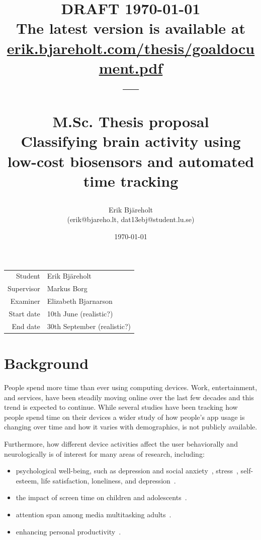 \documentclass{IEEEtran}
\title{%
    \small DRAFT \today \\
    \small The latest version is available at \href{https://erik.bjareholt.com/thesis/goaldocument.pdf}{erik.bjareholt.com/thesis/goaldocument.pdf}\\
    \large --- \\
    \large \par M.Sc. Thesis proposal\\
    \huge Classifying brain activity using low-cost biosensors and automated time tracking \\
}
\author{Erik Bjäreholt \\(erik@bjareho.lt, dat13ebj@student.lu.se)}
\date{\today}
\begin{document}
\maketitle

\begin{center}
\begin{tabular}{r l}
 Student & Erik Bjäreholt \\
 Supervisor & Markus Borg \\
 Examiner & Elizabeth Bjarnarson \\
 Start date & 10th June (realistic?) \\
 End date & 30th September (realistic?) \\
\end{tabular}
\end{center}

\setlength{\parskip}{0em}
\tableofcontents
\setlength{\parskip}{1em}


\section{Background}

People spend more time than ever using computing devices. Work, entertainment, and services, have been steadily moving online over the last few decades and this trend is expected to continue.
While several studies have been tracking how people spend time on their devices a wider study of how people's app usage is changing over time and how it varies with demographics, is not publicly available.

Furthermore, how different device activities affect the user behaviorally and neurologically is of interest for many areas of research, including:

\begin{itemize}
    \item psychological well-being, such as depression and social anxiety~\cite{selfhout_different_2009}\cite{shah_nonrecursive_2002}, stress~\cite{mark_stress_2014}, self-esteem, life satisfaction, loneliness, and depression~\cite{huang_time_2017}.
    \item the impact of screen time on children and adolescents~\cite{subrahmanyam_impact_2001}.
    \item attention span among media multitasking adults~\cite{mark_stress_2014}.
    \item enhancing personal productivity~\cite{kim_timeaware_2016}.
\end{itemize}
\end{document}
